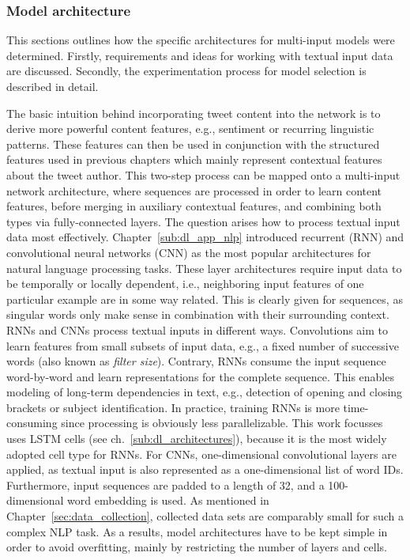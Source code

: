 \subsubsection{Model architecture}
\label{sub:comb_model_architecture}

This sections outlines how the specific architectures for multi-input models
were determined.
Firstly, requirements and ideas for working with textual input data
are discussed.
Secondly, the experimentation process for model selection is described in detail.

The basic intuition behind incorporating tweet content into the network is to
derive more powerful content features, e.g., sentiment or recurring linguistic
patterns.
These features can then be used in conjunction  with the structured features used in previous
chapters which mainly represent contextual features about the tweet author.
This two-step process can be mapped onto a multi-input network architecture,
where sequences are processed in order to learn content features, before
merging in auxiliary contextual features, and combining both types via fully-connected
layers.
The question arises how to process textual input data most effectively.
Chapter~\ref{sub:dl_app_nlp} introduced recurrent (RNN) and convolutional neural
networks (CNN) as the most popular architectures for natural language processing tasks.
These layer architectures require input data to be temporally or locally dependent,
i.e., neighboring input features of one particular example are in some way related.
This is clearly given for sequences, as singular words only make sense
in combination with their surrounding context.
RNNs and CNNs process textual inputs in different ways.
Convolutions aim to learn features from small subsets of input data, e.g., a
fixed number of successive words (also known as \textit{filter size}).
Contrary, RNNs consume the input sequence word-by-word and learn representations
for the complete sequence.
This enables modeling of long-term dependencies in text, e.g., detection of
opening and closing brackets or subject identification.
In practice, training RNNs is more time-consuming since processing is obviously less
parallelizable.
This work focusses uses LSTM cells (see ch.~\ref{sub:dl_architectures}), because
it is the most widely adopted cell type for RNNs.
For CNNs, one-dimensional convolutional layers are applied, as textual input is
also represented as a one-dimensional list of word IDs.
Furthermore, input sequences are padded to a length of 32, and a 100-dimensional
word embedding is used.
As mentioned in Chapter~\ref{sec:data_collection}, collected data sets are
comparably small for such a complex NLP task.
As a results, model architectures have to be kept simple in order to avoid
overfitting, mainly by restricting the number of layers and cells.

